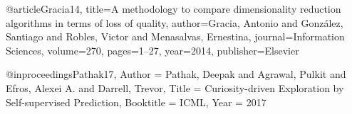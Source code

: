 
@article{Gracia14,
	title={A methodology to compare dimensionality reduction algorithms in terms of loss of quality},
	author={Gracia, Antonio and Gonz{\'a}lez, Santiago and Robles, Victor and Menasalvas, Ernestina},
	journal={Information Sciences},
	volume={270},
	pages={1--27},
	year={2014},
	publisher={Elsevier}
}

@inproceedings{Pathak17,
	Author = {Pathak, Deepak and
		Agrawal, Pulkit and
		Efros, Alexei A. and
		Darrell, Trevor},
	Title = {Curiosity-driven Exploration
		by Self-supervised Prediction},
	Booktitle = {ICML},
	Year = {2017}
}